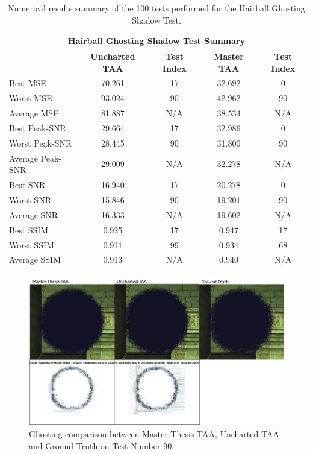 \documentclass[pregrado]{tesis-usb} %
\begin{document}
\begin{table}[H]
	\small
	\centering
	\caption{Numerical results summary of the 100 tests performed for the Hairball Ghosting Shadow Test.}
	\begin{tabular}{|l|c|c|c|c|}
		\hline
		\multicolumn{5}{|c|}{\textbf{Hairball Ghosting Shadow Test Summary}} \\
		\hline
		\multicolumn{1}{|c|}{\textbf{\diagbox{Tests}{AA}}} & \textbf{Uncharted TAA} & \textbf{Test Index} & \textbf{Master TAA} & \textbf{Test Index} \\
		\hline
	    Best MSE & 70.261 & 17    & 32.692 & 0 \\
		\hline
		Worst MSE & 93.024 & 90    & 42.962 & 90 \\
		\hline
		Average MSE & 81.887 & N/A   & 38.534 & N/A \\
		\hline
		Best Peak-SNR & 29.664 & 17    & 32.986 & 0 \\
		\hline
		Worst Peak-SNR & 28.445 & 90    & 31.800 & 90 \\
		\hline
		Average Peak-SNR  & 29.009 & N/A   & 32.278 & N/A \\
		\hline
		Best SNR & 16.940 & 17    & 20.278 & 0 \\
		\hline
		Worst SNR & 15.846 & 90    & 19.201 & 90 \\
		\hline
		Average SNR  & 16.333 & N/A   & 19.602 & N/A \\
		\hline
		Best SSIM & 0.925 & 17    & 0.947 & 17 \\
		\hline
		Worst SSIM & 0.911 & 99    & 0.934 & 68 \\
		\hline
		Average SSIM & 0.913 & N/A   & 0.940 & N/A \\
		\hline
	\end{tabular}%
	\label{tab:hairball_ghosting_shadow}%
\end{table}%

\begin{figure}[H]
	\centering
	\includegraphics[scale=0.8]{images/results/hairball_ghosting_shadow.png}
	\caption{Ghosting comparison between Master Thesis TAA, Uncharted TAA and Ground Truth on Test Number 90.}\label{fig:hairball_ghosting_shadow}
\end{figure}
\end{document}
